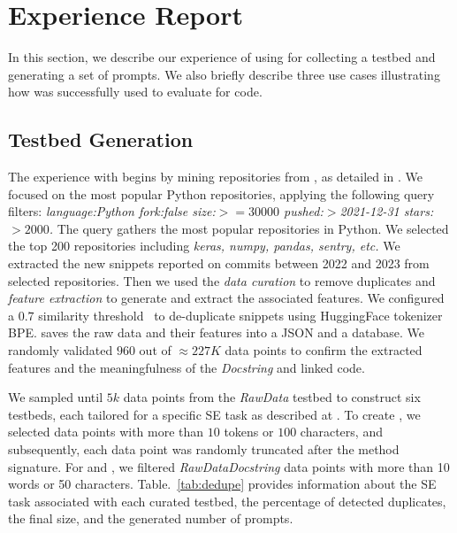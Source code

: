 \section{Experience Report}\label{sec:experience}

In this section, we describe our experience of using \snipgen for collecting a testbed and generating a set of prompts. We also briefly describe three use cases illustrating how \snipgen was successfully used to evaluate \llms for code.

\subsection{\snipgen Testbed Generation}

The experience with \snipgen begins by mining repositories from \github, as detailed in . We focused on the most popular Python repositories, applying the following query filters: \textit{language:Python fork:false size:$>=30000$ pushed:$>$2021-12-31 stars: $> 2000$.} The query gathers the most popular repositories in Python. We selected the top 200 repositories including \textit{keras, numpy, pandas, sentry, etc.} We extracted the new snippets reported on commits between 2022 and 2023 from selected repositories. Then we used the \textit{data curation} to remove duplicates and \textit{feature extraction} to generate and extract the associated features. We configured a $0.7$ similarity threshold~\cite{Allamanis19, wang_neural_2019} to de-duplicate snippets using HuggingFace tokenizer BPE. \snipgen saves the raw data and their features into a JSON and a database.  We randomly validated $960$ out of $\approx 227K$  data points to confirm the extracted features and the meaningfulness of the \textit{Docstring} and linked code.

We sampled until $5k$ data points from the \textit{RawData} testbed to construct six testbeds, each tailored for a specific SE task as described at . To create \randomCut, we selected data points with more than $10$ tokens or $100$ characters, and subsequently, each data point was randomly truncated after the method signature. For \summarizationGen and \commitGen, we filtered \textit{RawDataDocstring} data points with more than 10 words or 50 characters. Table.~\ref{tab:dedupe} provides information about the SE task associated with each curated testbed, the percentage of detected duplicates, the final size, and the generated number of prompts.



